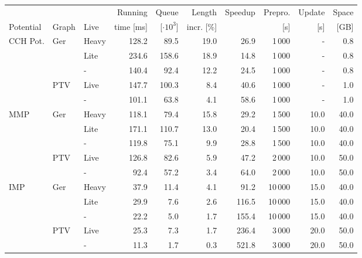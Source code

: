 \begin{tabular}{lllrrrrrrr}
\toprule
          &         &      & Running   & Queue          &  Length     & Speedup & Prepro. & Update & Space \\
Potential & Graph  & Live  & time [ms] & [$\cdot 10^3$] &  incr. [\%] &         &     [s] &    [s] &  [GB] \\
\midrule
CCH Pot. & Ger & Heavy &     128.2 &           89.5 &        19.0 &    26.9 &  1\,000 &    - &  0.8 \\
         &     & Lite  &     234.6 &          158.6 &        18.9 &    14.8 &  1\,000 &    - &  0.8 \\
         &     & -     &     140.4 &           92.4 &        12.2 &    24.5 &  1\,000 &    - &  0.8 \\
         & PTV & Live  &     147.7 &          100.3 &         8.4 &    40.6 &  1\,000 &    - &  1.0 \\
         &     & -     &     101.1 &           63.8 &         4.1 &    58.6 &  1\,000 &    - &  1.0 \\ \addlinespace
MMP      & Ger & Heavy &     118.1 &           79.4 &        15.8 &    29.2 &  1\,500 & 10.0 & 40.0 \\
         &     & Lite  &     171.1 &          110.7 &        13.0 &    20.4 &  1\,500 & 10.0 & 40.0 \\
         &     & -     &     119.8 &           75.1 &         9.9 &    28.8 &  1\,500 & 10.0 & 40.0 \\
         & PTV & Live  &     126.8 &           82.6 &         5.9 &    47.2 &  2\,000 & 10.0 & 50.0 \\
         &     & -     &      92.4 &           57.2 &         3.4 &    64.0 &  2\,000 & 10.0 & 50.0 \\ \addlinespace
IMP      & Ger & Heavy &      37.9 &           11.4 &         4.1 &    91.2 & 10\,000 & 15.0 & 40.0 \\
         &     & Lite  &      29.9 &            7.6 &         2.6 &   116.5 & 10\,000 & 15.0 & 40.0 \\
         &     & -     &      22.2 &            5.0 &         1.7 &   155.4 & 10\,000 & 15.0 & 40.0 \\
         & PTV & Live  &      25.3 &            7.3 &         1.7 &   236.4 &  3\,000 & 20.0 & 50.0 \\
         &     & -     &      11.3 &            1.7 &         0.3 &   521.8 &  3\,000 & 20.0 & 50.0 \\
\bottomrule
\end{tabular}
